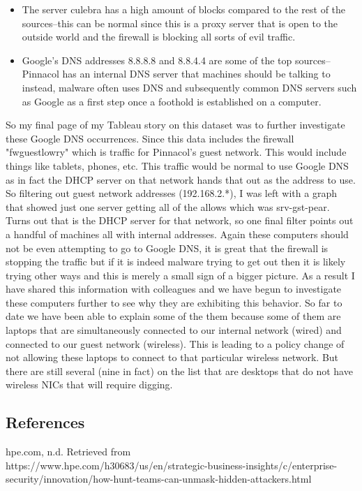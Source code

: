 \documentclass[10pt]{article}
\begin{document}
\begin{itemize}
\item The server culebra has a high amount of blocks compared to the rest of the sources--this can be normal since this is a proxy server that is open to the outside world and the firewall is blocking all sorts of evil traffic.
\item Google's DNS addresses 8.8.8.8 and 8.8.4.4 are some of the top sources--Pinnacol has an internal DNS server that machines should be talking to instead, malware often uses DNS and subsequently common DNS servers such as Google as a first step once a foothold is established on a computer.
\end{itemize}
So my final page of my Tableau story on this dataset was to further investigate these Google DNS occurrences. Since this data includes the firewall "fwguestlowry" which is traffic for Pinnacol's guest network. This would include things like tablets, phones, etc. This traffic would be normal to use Google DNS as in fact the DHCP server on that network hands that out as the address to use. So filtering out guest network addresses (192.168.2.*), I was left with a graph that showed just one server getting all of the allows which was srv-gst-pear. Turns out that is the DHCP server for that network, so one final filter points out a handful of machines all with internal addresses. Again these computers should not be even attempting to go to Google DNS, it is great that the firewall is stopping the traffic but if it is indeed malware trying to get out then it is likely trying other ways and this is merely a small sign of a bigger picture. As a result I have shared this information with colleagues and we have begun to investigate these computers further to see why they are exhibiting this behavior. So far to date we have been able to explain some of the them because some of them are laptops that are simultaneously connected to our internal network (wired) and connected to our guest network (wireless). This is leading to a policy change of not allowing these laptops to connect to that particular wireless network. But there are still several (nine in fact) on the list that are desktops that do not have wireless NICs that will require digging. 
\subsection*{References}
hpe.com, n.d. Retrieved from\\ https://www.hpe.com/h30683/us/en/strategic-business-insights/c/enterprise-security/innovation/how-hunt-teams-can-unmask-hidden-attackers.html
\end{document}
